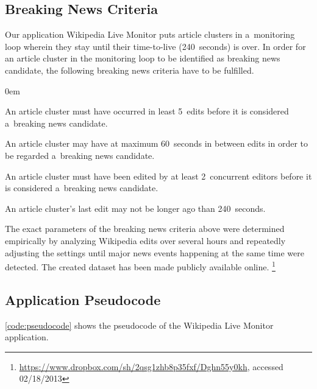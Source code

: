 \documentclass{sig-alternate}
\newcommand{\inlinelistingsize}{\fontsize{8pt}{11pt}}
\let\oldurl\url
\renewcommand{\url}[1]{\inlinelistingsize\oldurl{#1}}
\begin{document}
\subsection{Breaking News Criteria}

Our application Wikipedia Live Monitor puts  
article clusters in a~monitoring loop wherein they stay
until their time-to-live (240~seconds) is over.
In order for an article cluster in the monitoring loop
to be identified as breaking news candidate,
the following breaking news criteria have to be fulfilled.

\begin{description}
  \itemsep0em
  \item[$\geq$~5~Occurrences:] An article cluster must have occurred
  in least 5~edits before it is considered a~breaking news candidate.
  \item[$\leq$~60~Seconds Between Edits:] An article cluster may have
  at maximum 60~seconds in between edits in order to be regarded
  a~breaking news candidate.
  \item[$\geq$~2~Concurrent Editors:] An article cluster must have been edited
  by at least 2~concurrent editors before it is considered a~breaking news candidate.
  \item[$\leq$~240~Seconds Since Last Edit:] An article cluster's last edit
  may not be longer ago than 240~seconds.
\end{description}

The exact parameters of the breaking news criteria above
were determined empirically by analyzing Wikipedia edits
over several hours and repeatedly adjusting the settings until
major news events happening at the same time were detected.
The created dataset has been made publicly available online.%
\footnote{\url{https://www.dropbox.com/sh/2qsg1zhb8p35fxf/Dghn55y0kh},
accessed 02/18/2013}

\subsection{Application Pseudocode}

\autoref{code:pseudocode} shows the pseudocode of the
Wikipedia Live Monitor application.
\end{document}
